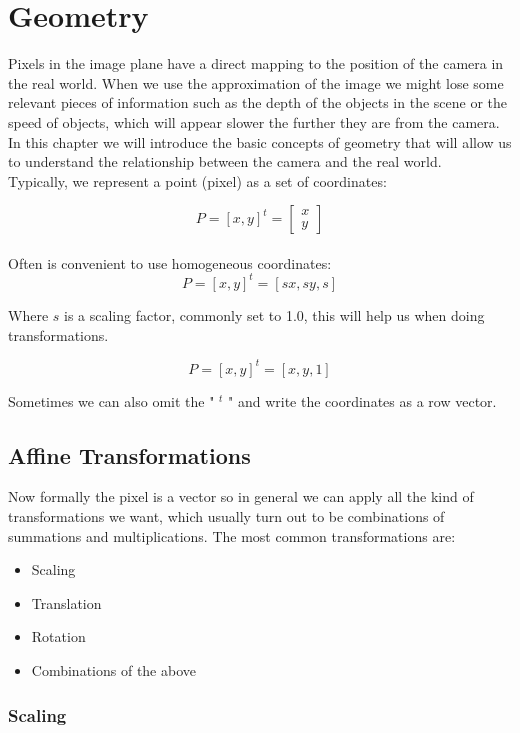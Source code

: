 \chapter{Geometry}

Pixels in the image plane have a direct mapping to the position of the camera in the real world. When we use the approximation of the image we might lose some relevant pieces of information such as the depth of the objects in the scene or the speed of objects, which will appear slower the further they are from the camera. 
\\
In this chapter we will introduce the basic concepts of geometry that will allow us to understand the relationship between the camera and the real world.
\\
Typically, we represent a point (pixel) as a set of coordinates:

\[ P = [ x, y ]^t = \begin{bmatrix} x \\ y \end{bmatrix}\]
\\
Often is convenient to use homogeneous coordinates:
\[ P = [ x, y ]^t = [sx, sy, s]\]

Where \( s \) is a scaling factor, commonly set to 1.0, this will help us when doing transformations.

\[ P = [ x, y ]^t = [x, y, 1]\]

Sometimes we can also omit the " \(^t\) " and write the coordinates as a row vector.

\section{Affine Transformations}

Now formally the pixel is a vector so in general we can apply all the kind of transformations we want, which usually turn out to be combinations of summations and multiplications. 
The most common transformations are:

\begin{itemize} 
    \item Scaling 
    \item Translation 
    \item Rotation 
    \item Combinations of the above 
\end{itemize}

\subsection{Scaling}

